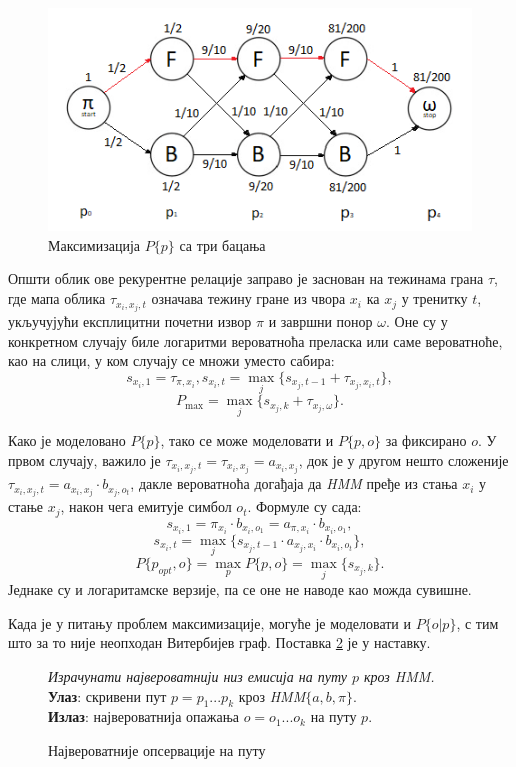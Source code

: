 \documentclass[12pt,oneside]{memoir}
\newenvironment{problem}[1][!ht]
{\renewcommand{\algorithmcfname}{Проблем}
\begin{figure}[!ht]
\centering
  \begin{minipage}{.94\linewidth}
	\begin{algorithm}[#1]%
  }{\end{algorithm}
  \end{minipage}
\end{figure}}
\begin{document}
\begin{CJK}{UTF8}{ipxm}
\begin{figure}[!ht]
  \centering
  \includegraphics[width=.9\textwidth]{tri_bacanja.png}
  \caption{Максимизација $P\{p\}$ са три бацања}
  \label{fig:tribac}
\end{figure}

Општи облик ове рекурентне релације заправо је заснован на тежинама грана $\tau$, где мапа облика $\tau_{x_i, x_j, t}$ означава тежину гране из чвора $x_i$ ка $x_j$ у тренитку $t$, укључујући експлицитни почетни извор $\pi$ и завршни понор $\omega$. Оне су у конкретном случају биле логаритми вероватноћа преласка или саме вероватноће, као на слици, у ком случају се множи уместо сабира: $$s_{x_i, 1} = \tau_{\pi, x_i}, s_{x_i, t} = \max_j \{s_{x_j, t-1} + \tau_{x_j, x_i, t}\},$$ $$P_{\max} = \max_j \{s_{x_j, k} + \tau_{x_j, \omega}\}.$$

Како је моделовано $P\{p\}$, тако се може моделовати и $P\{p, o\}$ за фиксирано $o$. У првом случају, важило је $\tau_{x_i, x_j, t} = \tau_{x_i, x_j} = a_{x_i, x_j}$, док је у другом нешто сложеније $\tau_{x_i, x_j, t} = a_{x_i, x_j} \cdot b_{x_j, o_t}$, дакле вероватноћа догађаја да \textit{HMM} пређе из стања $x_i$ у стање $x_j$, након чега емитује симбол $o_t$. Формуле су сада: $$s_{x_i, 1} = \pi_{x_i} \cdot b_{x_i, o_1} = a_{\pi, x_i} \cdot b_{x_i, o_1},$$ $$s_{x_i, t} = \max_j \{s_{x_j, t-1} \cdot a_{x_j, x_i} \cdot b_{x_i, o_t}\},$$ $$P\{p_{opt}, o\} = \max_p P\{p, o\} = \max_j \{s_{x_j, k}\}.$$ Једнаке су и логаритамске верзије, па се оне не наводе као можда сувишне.

Када је у питању проблем максимизације, могуће је моделовати и $P\{o | p\}$, с тим што за то није неопходан Витербијев граф. Поставка \ref{prob:maxops} је у наставку.

\begin{problem}[H]
  \SetAlgoLined
  \textit{Израчунати највероватнији низ емисија на путу $p$ кроз \textit{HMM}.}\\
  \textbf{Улаз}: скривени пут $p = p_1...p_k$ кроз \textit{HMM}$\{a, b, \pi\}$.\\
  \textbf{Излаз}: највероватнија опажања $o = o_1...o_k$ на путу $p$.
  \caption{Највероватније опсервације на путу}
  \label{prob:maxops}
\end{problem}


\end{CJK}
\end{document}
